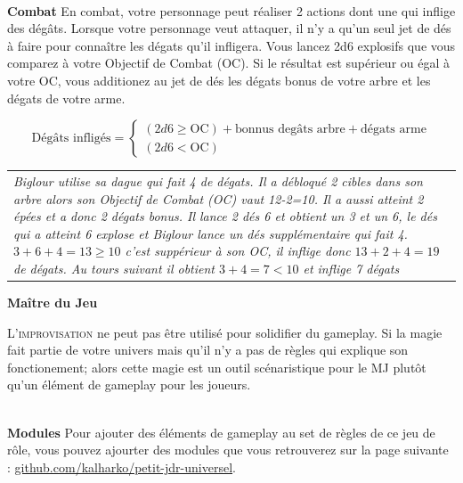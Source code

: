 \documentclass[11pt]{article} %
\newcommand{\enluminure}[2]{\lettrine[lines=3]{\small \initfamily #1}{#2}}
\newcommand{\myjump}[1][1]{\mbox{}\\[#1cm]}
\begin{document}
\myjump[0]
\textbf{Combat}\newline
En combat, votre personnage peut réaliser 2 actions dont une qui inflige des dégâts.
Lorsque votre personnage veut attaquer, il n'y a qu'un seul jet de dés à faire pour connaître les dégats qu'il infligera. Vous lancez 2d6 explosifs que vous comparez à votre Objectif de Combat (OC). Si le résultat est supérieur ou égal à  votre OC, vous additionez au jet de dés les dégats bonus de votre arbre et les dégats de votre arme.

$$
\mbox{Dégâts infligés} =
\left\{
    \begin{array}{ll}
        (2d6 \ge \mbox{OC}) + \mbox{bonnus degâts arbre} + \mbox{dégats arme}\\
(2d6 < \mbox{OC})
    \end{array}
\right.
$$

\noindent
\begin{tabularx}{\linewidth}{|X}
\emph{Biglour utilise sa dague qui fait 4 de dégats. Il a débloqué 2 cibles dans son arbre alors son Objectif de Combat (OC) vaut 12-2=10. Il a aussi atteint 2 épées et a donc 2 dégats bonus.
Il lance 2 dés 6 et obtient un 3 et un 6, le dés qui a atteint 6 explose et Biglour lance un dés supplémentaire qui fait 4. $3 + 6 + 4 = 13 \ge 10$ c'est suppérieur à son OC, il inflige donc $13 + 2 + 4 = 19$ de dégats. Au tours suivant il obtient $3 + 4 = 7 < 10$ et inflige 7 dégats}\\
\end{tabularx}










\newpage
\textbf{\huge Maître du Jeu}

\enluminure{L}{'improvisation} ne peut pas être utilisé pour solidifier du gameplay. Si la magie fait partie de votre univers mais qu'il n'y a pas de règles qui explique son fonctionement; alors cette magie est un outil scénaristique pour le MJ plutôt qu'un élément de gameplay pour les joueurs.

\myjump[0]
\textbf{Modules}\newline
\noindent Pour ajouter des éléments de gameplay au set de règles de ce jeu de rôle, vous pouvez ajourter des modules que vous retrouverez sur la page suivante : \href{https://github.com/kalharko/petit-jdr-universel}{github.com/kalharko/petit-jdr-universel}.
\end{document}
